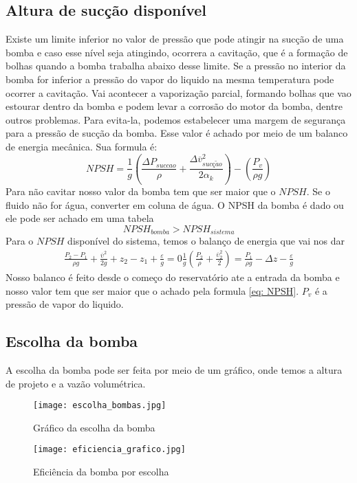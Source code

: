 \subsection{Altura de sucção disponível}
Existe um limite inferior no valor de pressão que pode atingir na sucção de uma bomba e caso esse
nível seja atingindo, ocorrera a cavitação, que é a formação de bolhas quando a bomba trabalha
abaixo desse limite. Se a pressão no interior da bomba for inferior a pressão do vapor do liquido na
mesma temperatura pode ocorrer a cavitação. Vai acontecer a vaporização parcial, formando bolhas que
vao estourar dentro da bomba e podem levar a corrosão do motor da bomba, dentre outros problemas.
Para evita-la, podemos estabelecer uma margem de segurança para a pressão de sucção da bomba. Esse
valor é achado por meio de um balanco de energia mecânica. Sua formula é:
\begin{equation}\label{eq: NPSH}
    NPSH = \frac{1}{g}\left( \frac{\Delta P_{succao}}{\rho} + \frac{\Delta \overline{v}^2_{sucç\tilde{a}o}}{2 \alpha _k}\right) - \left(\frac{P_v}{\rho g}\right)
\end{equation}
Para não cavitar nosso valor da bomba tem que ser maior que o \(NPSH\). Se o fluido não for água,
converter em coluna de água. O NPSH da bomba é dado ou ele pode ser achado em uma tabela
\begin{equation}
    NPSH_{bomba} > NPSH_{sistema}  
\end{equation}
Para o \(NPSH\) disponível do sistema, temos o balanço de energia que vai nos dar
\begin{align}
    \frac{P_2 - P_1}{\rho g} + \frac{\overline{\upsilon } ^{2} }{2g} + z_2 - z_1 + \frac{\varepsilon}{g} = 0
    \frac{1}{g} \left( \frac{P_2}{\rho } + \frac{\overline{\upsilon }^{2}_2}{2}  \right) = \frac{P_1}{\rho g} - \Delta z - \frac{\varepsilon}{g}
\end{align}
Nosso balanco é feito desde o começo do reservatório ate a entrada da bomba e nosso valor tem que
ser maior que o achado pela formula \eqref{eq: NPSH}. \(P_v\) é a pressão de vapor do liquido.
\subsection{Escolha da bomba}
A escolha da bomba pode ser feita por meio de um gráfico, onde temos a altura de projeto e a vazão
volumétrica. 
\begin{figure}[H]
    \centering
    \texttt{[image: escolha\_bombas.jpg]}
    \caption{Gráfico da escolha da bomba}
    \label{fig: escolha_bomba}
\end{figure}
\begin{figure}[H]
    \centering
    \texttt{[image: eficiencia\_grafico.jpg]}
    \caption{Eficiência da bomba por escolha}
    \label{fig: eficiencia_bom}
\end{figure}

